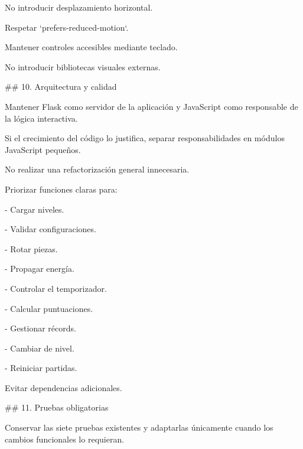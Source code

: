 \noindent No introducir desplazamiento horizontal.\par
\par\smallskip
\noindent Respetar `prefers-reduced-motion`.\par
\par\smallskip
\noindent Mantener controles accesibles mediante teclado.\par
\par\smallskip
\noindent No introducir bibliotecas visuales externas.\par
\par\smallskip
\noindent \#\# 10. Arquitectura y calidad\par
\par\smallskip
\noindent Mantener Flask como servidor de la aplicación y JavaScript como responsable de la lógica interactiva.\par
\par\smallskip
\noindent Si el crecimiento del código lo justifica, separar responsabilidades en módulos JavaScript pequeños.\par
\par\smallskip
\noindent No realizar una refactorización general innecesaria.\par
\par\smallskip
\noindent Priorizar funciones claras para:\par
\par\smallskip
\noindent - Cargar niveles.\par
\noindent - Validar configuraciones.\par
\noindent - Rotar piezas.\par
\noindent - Propagar energía.\par
\noindent - Controlar el temporizador.\par
\noindent - Calcular puntuaciones.\par
\noindent - Gestionar récords.\par
\noindent - Cambiar de nivel.\par
\noindent - Reiniciar partidas.\par
\par\smallskip
\noindent Evitar dependencias adicionales.\par
\par\smallskip
\noindent \#\# 11. Pruebas obligatorias\par
\par\smallskip
\noindent Conservar las siete pruebas existentes y adaptarlas únicamente cuando los cambios funcionales lo requieran.\par
